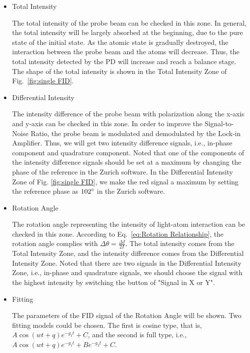 \documentclass{article}
\begin{document}
\begin{itemize}
    \item Total Intensity


    The total intensity of the probe beam can be checked in this zone. In general, the total intensity will be largely absorbed at the beginning, due to the pure state of the initial state. As the atomic state is gradually destroyed, the interaction between the probe beam and the atoms will decrease. Thus, the total intensity detected by the PD will increase and reach a balance stage. The shape of the total intensity is shown in the Total Intensity Zone of Fig.~\ref{fig:single FID}.       
    \item Differential Intensity


    The intensity difference of the probe beam with polarization along the x-axis and y-axis can be checked in this zone. In order to improve the Signal-to-Noise Ratio, the probe beam is modulated and demodulated by the Lock-in Amplifier. Thus, we will get two intensity difference signals, i.e., in-phase component and quadrature component. Noted that one of the components of the intensity difference signals should be set at a maximum by changing the phase of the reference in the Zurich software. In the Differential Intensity Zone of Fig. \ref{fig:single FID}, we make the red signal a maximum by setting the reference phase as $102\degree$ in the Zurich software. 

    \item Rotation Angle

    The rotation angle representing the intensity of light-atom interaction can be checked in this zone. According to Eq.~\eqref{eq:Rotation Relationship}, the rotation angle complies with $\Delta\theta=\frac{\Delta I}{2I}$. The total intensity comes from the Total Intensity Zone, and the intensity difference comes from the Differential Intensity Zone. Noted that there are two signals in the Differential Intensity Zone, i.e., in-phase and quadrature signals, we should choose the signal with the highest intensity by switching the button of "Signal in X or Y".
    
    \item Fitting

    The parameters of the FID signal of the Rotation Angle will be shown. Two fitting models could be chosen. The first is cosine type, that is, $A\cos\left(wt+q \right)e^{-g_1t}+C$, and the second is full type, i.e., $A\cos\left(wt+q \right)e^{-g_1t}+Be^{-g_2t}+C$.  
     

\end{itemize}
\end{document}
